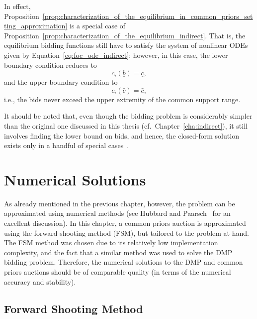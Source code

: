 In effect, Proposition~\ref{prop:characterization_of_the_equilibrium_in_common_priors_setting_approximation} is a special case of Proposition~\ref{prop:characterization_of_the_equilibrium_indirect}. That is, the equilibrium bidding functions still have to satisfy the system of nonlinear ODEs given by Equation~\eqref{eq:foc_ode_indirect}; however, in this case, the lower boundary condition reduces to
\begin{equation*}
  c_i(\underline{b}) = \underline{c},
\end{equation*}
and the upper boundary condition to
\begin{equation*}
  c_i(\bar{c}) = \bar{c},
\end{equation*}
i.e., the bids never exceed the upper extremity of the common support range.

It should be noted that, even though the bidding problem is considerably simpler than the original one discussed in this thesis (cf.~Chapter~\ref{cha:indirect}), it still involves finding the lower bound on bids, and hence, the closed-form solution exists only in a handful of special cases~\cite{Krishna10,HubbardPaarsch2011}.


\section{Numerical Solutions} %
\label{sec:numerical_solutions}

As already mentioned in the previous chapter, however, the problem can be approximated using numerical methods (see Hubbard and Paarsch~\cite{HubbardPaarsch2011} for an excellent discussion). In this chapter, a common priors auction is approximated using the forward shooting method (FSM), but tailored to the problem at hand. The FSM method was chosen due to its relatively low implementation complexity, and the fact that a similar method was used to solve the DMP bidding problem. Therefore, the numerical solutions to the DMP and common priors auctions should be of comparable quality (in terms of the numerical accuracy and stability).

\subsection{Forward Shooting Method} %
\label{sub:forward_shooting_method}

